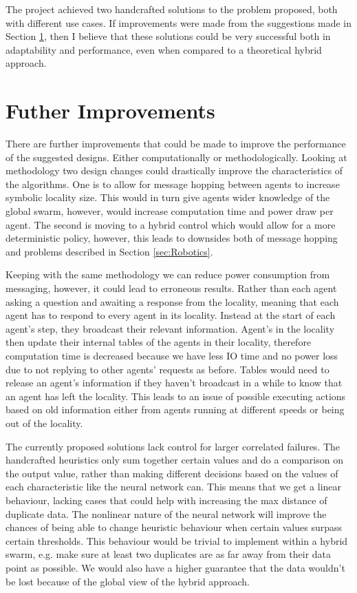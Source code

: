 \documentclass{UoYCSproject}
\begin{document}
The project achieved two handcrafted solutions to the problem proposed, both with different use cases.
If improvements were made from the suggestions made in Section \ref{sec:further}, then I believe that these solutions could be very successful both in adaptability and performance, even when compared to a theoretical hybrid approach.

\section{Futher Improvements}
\label{sec:further}

There are further improvements that could be made to improve the performance of the suggested designs.
Either computationally or methodologically.
Looking at methodology two design changes could drastically improve the characteristics of the algorithms.
One is to allow for message hopping between agents to increase symbolic locality size.
This would in turn give agents wider knowledge of the global swarm, however, would increase computation time and power draw per agent.
The second is moving to a hybrid control which would allow for a more deterministic policy, however, this leads to downsides both of message hopping and problems described in Section \ref{sec:Robotics}.

Keeping with the same methodology we can reduce power consumption from messaging, however, it could lead to erroneous results.
Rather than each agent asking a question and awaiting a response from the locality, meaning that each agent has to respond to every agent in its locality.
Instead at the start of each agent's step, they broadcast their relevant information.
Agent’s in the locality then update their internal tables of the agents in their locality, therefore computation time is decreased because we have less IO time and no power loss due to not replying to other agents' requests as before.
Tables would need to release an agent's information if they haven’t broadcast in a while to know that an agent has left the locality.
This leads to an issue of possible executing actions based on old information either from agents running at different speeds or being out of the locality.

The currently proposed solutions lack control for larger correlated failures.
The handcrafted heuristics only sum together certain values and do a comparison on the output value, rather than making different decisions based on the values of each characteristic like the neural network can.
This means that we get a linear behaviour, lacking cases that could help with increasing the max distance of duplicate data.
The nonlinear nature of the neural network will improve the chances of being able to change heuristic behaviour when certain values surpass certain thresholds.
This behaviour would be trivial to implement within a hybrid swarm, e.g. make sure at least two duplicates are as far away from their data point as possible.
We would also have a higher guarantee that the data wouldn’t be lost because of the global view of the hybrid approach.
\end{document}

